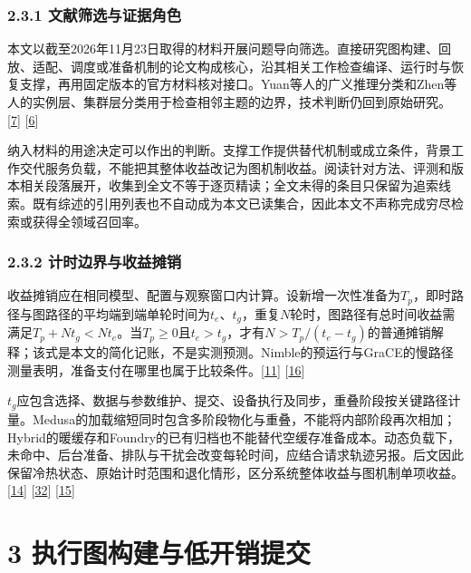 \documentclass[
  11pt,
  UTF8]{ctexart}
\begin{document}
\hypertarget{section-2-3-1}{%
\subsubsection{2.3.1 文献筛选与证据角色}\label{section-2-3-1}}

本文以截至2026年11月23日取得的材料开展问题导向筛选。直接研究图构建、回放、适配、调度或准备机制的论文构成核心，沿其相关工作检查编译、运行时与恢复支撑，再用固定版本的官方材料核对接口。Yuan等人的广义推理分类和Zhen等人的实例层、集群层分类用于检查相邻主题的边界，技术判断仍回到原始研究。{[}\protect\hyperlink{ref-yuan2024unveiled}{7}{]}
{[}\protect\hyperlink{ref-zhen2025titans}{6}{]}

纳入材料的用途决定可以作出的判断。支撑工作提供替代机制或成立条件，背景工作交代服务负载，不能把其整体收益改记为图机制收益。阅读针对方法、评测和版本相关段落展开，收集到全文不等于逐页精读；全文未得的条目只保留为追索线索。既有综述的引用列表也不自动成为本文已读集合，因此本文不声称完成穷尽检索或获得全领域召回率。

\hypertarget{section-2-3-2}{%
\subsubsection{2.3.2 计时边界与收益摊销}\label{section-2-3-2}}

收益摊销应在相同模型、配置与观察窗口内计算。设新增一次性准备为\(T_p\)，即时路径与图路径的平均端到端单轮时间为\(t_e\)、\(t_g\)，重复\(N\)轮时，图路径有总时间收益需满足\(T_p+N t_g<N t_e\)。当\(T_p\geq0\)且\(t_e>t_g\)，才有\(N>T_p/(t_e-t_g)\)的普通摊销解释；该式是本文的简化记账，不是实测预测。Nimble的预运行与GraCE的慢路径测量表明，准备支付在哪里也属于比较条件。{[}\protect\hyperlink{ref-kwon2020nimble}{11}{]}
{[}\protect\hyperlink{ref-ghosh2026grace}{16}{]}

\(t_g\)应包含选择、数据与参数维护、提交、设备执行及同步，重叠阶段按关键路径计量。Medusa的加载缩短同时包含多阶段物化与重叠，不能将内部阶段再次相加；Hybrid的暖缓存和Foundry的已有归档也不能替代空缓存准备成本。动态负载下，未命中、后台准备、排队与干扰会改变每轮时间，应结合请求轨迹另报。后文因此保留冷热状态、原始计时范围和退化情形，区分系统整体收益与图机制单项收益。{[}\protect\hyperlink{ref-zeng2025medusa}{14}{]}
{[}\protect\hyperlink{ref-yadav2026hybridpreprint}{32}{]}
{[}\protect\hyperlink{ref-liu2026foundry}{15}{]}

\hypertarget{section-3}{%
\section{3 执行图构建与低开销提交}\label{section-3}}
\end{document}
